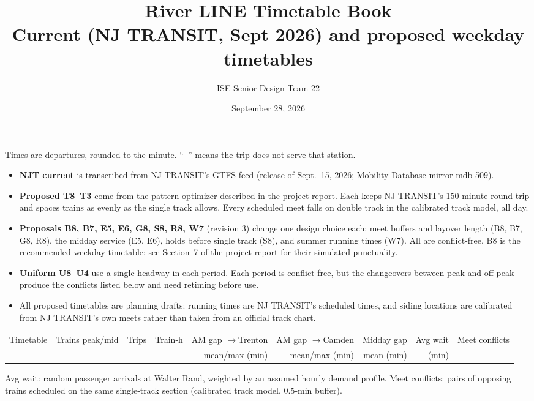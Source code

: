 \documentclass[10pt,landscape]{article}
\title{River LINE Timetable Book\\\large Current (NJ TRANSIT, Sept 2026) and proposed weekday timetables}
\author{ISE Senior Design Team 22}
\date{September 28, 2026}
\begin{document}
\maketitle
\noindent Times are departures, rounded to the minute. ``--'' means the trip does not serve that station.
\begin{itemize}
\item \textbf{NJT current} is transcribed from NJ TRANSIT's GTFS feed (release of Sept.~15, 2026; Mobility Database mirror mdb-509).
\item \textbf{Proposed T8--T3} come from the pattern optimizer described in the project report. Each keeps NJ TRANSIT's 150-minute round trip and spaces trains as evenly as the single track allows. Every scheduled meet falls on double track in the calibrated track model, all day.
\item \textbf{Proposals B8, B7, E5, E6, G8, S8, R8, W7} (revision 3) change one design choice each: meet buffers and layover length (B8, B7, G8, R8), the midday service (E5, E6), holds before single track (S8), and summer running times (W7). All are conflict-free. B8 is the recommended weekday timetable; see Section~7 of the project report for their simulated punctuality.
\item \textbf{Uniform U8--U4} use a single headway in each period. Each period is conflict-free, but the changeovers between peak and off-peak produce the conflicts listed below and need retiming before use.
\item All proposed timetables are planning drafts: running times are NJ TRANSIT's scheduled times, and siding locations are calibrated from NJ TRANSIT's own meets rather than taken from an official track chart.
\end{itemize}
\begin{center}\small
\begin{tabular}{@{}lrrrrrrrr@{}}\toprule
Timetable & Trains peak/mid & Trips & Train-h & AM gap $\to$Trenton & AM gap $\to$Camden & Midday gap & Avg wait & Meet conflicts\\
 & & & & mean/max (min) & mean/max (min) & mean (min) & (min) & \\\midrule
\bottomrule\end{tabular}\end{center}
\noindent Avg wait: random passenger arrivals at Walter Rand, weighted by an assumed hourly demand profile. Meet conflicts: pairs of opposing trains scheduled on the same single-track section (calibrated track model, 0.5-min buffer).
\clearpage
\tableofcontents
\clearpage

\end{document}
